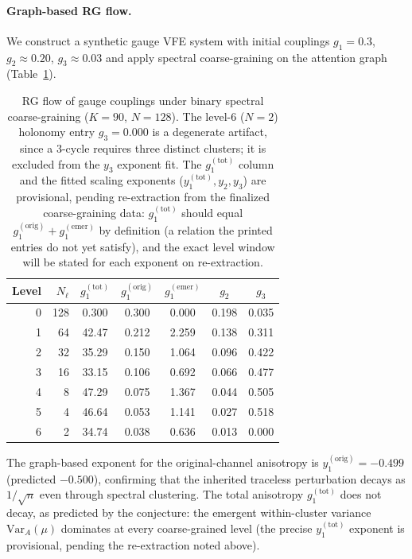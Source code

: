 \documentclass[twoside,11pt]{article}
\begin{document}
\paragraph{Graph-based RG flow.}
We construct a synthetic gauge VFE system with initial couplings $g_1 = 0.3$, $g_2 \approx 0.20$, $g_3 \approx 0.03$ and apply spectral coarse-graining on the attention graph (Table~\ref{tab:rg_flow_supp}).

\begin{table}[t]
\centering
\caption{RG flow of gauge couplings under binary spectral coarse-graining ($K = 90$, $N = 128$). The level-6 ($N = 2$) holonomy entry $g_3 = 0.000$ is a degenerate artifact, since a 3-cycle requires three distinct clusters; it is excluded from the $y_3$ exponent fit. The $g_1^{(\mathrm{tot})}$ column and the fitted scaling exponents ($y_1^{(\mathrm{tot})}, y_2, y_3$) are provisional, pending re-extraction from the finalized coarse-graining data: $g_1^{(\mathrm{tot})}$ should equal $g_1^{(\mathrm{orig})} + g_1^{(\mathrm{emer})}$ by definition (a relation the printed entries do not yet satisfy), and the exact level window will be stated for each exponent on re-extraction.}
\label{tab:rg_flow_supp}
\begin{tabular}{rrccccc}
\toprule
\textbf{Level} & $N_\ell$ & $g_1^{(\mathrm{tot})}$ & $g_1^{(\mathrm{orig})}$ & $g_1^{(\mathrm{emer})}$ & $g_2$ & $g_3$ \\
\midrule
0 & 128 & 0.300 & 0.300 & 0.000 & 0.198 & 0.035 \\
1 & 64 & 42.47 & 0.212 & 2.259 & 0.138 & 0.311 \\
2 & 32 & 35.29 & 0.150 & 1.064 & 0.096 & 0.422 \\
3 & 16 & 33.15 & 0.106 & 0.692 & 0.066 & 0.477 \\
4 & 8 & 47.29 & 0.075 & 1.367 & 0.044 & 0.505 \\
5 & 4 & 46.64 & 0.053 & 1.141 & 0.027 & 0.518 \\
6 & 2 & 34.74 & 0.038 & 0.636 & 0.013 & 0.000 \\
\bottomrule
\end{tabular}
\end{table}

The graph-based exponent for the original-channel anisotropy is $y_1^{(\mathrm{orig})} = -0.499$ (predicted $-0.500$), confirming that the inherited traceless perturbation decays as $1/\sqrt{n}$ even through spectral clustering. The total anisotropy $g_1^{(\mathrm{tot})}$ does not decay, as predicted by the conjecture: the emergent within-cluster variance $\mathrm{Var}_A(\mu)$ dominates at every coarse-grained level (the precise $y_1^{(\mathrm{tot})}$ exponent is provisional, pending the re-extraction noted above).
\end{document}
